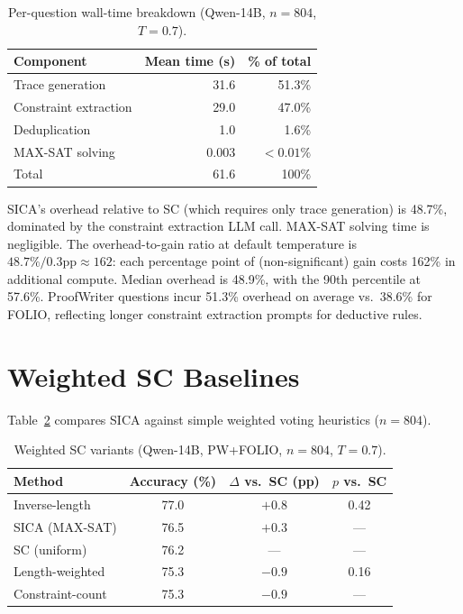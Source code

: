 \documentclass[11pt]{article}
\begin{document}
\begin{table}[h]
\centering
\caption{Per-question wall-time breakdown (Qwen-14B, $n{=}804$, $T{=}0.7$).}
\label{tab:overhead}
\small
\begin{tabular}{@{}lrr@{}}
\toprule
Component & Mean time (s) & \% of total \\
\midrule
Trace generation & 31.6 & 51.3\% \\
Constraint extraction & 29.0 & 47.0\% \\
Deduplication & 1.0 & 1.6\% \\
MAX-SAT solving & 0.003 & ${<}0.01\%$ \\
\midrule
Total & 61.6 & 100\% \\
\bottomrule
\end{tabular}
\end{table}

SICA's overhead relative to SC (which requires only trace generation) is 48.7\%, dominated by the constraint extraction LLM call.
MAX-SAT solving time is negligible.
The overhead-to-gain ratio at default temperature is $48.7\% / 0.3\text{pp} \approx 162$: each percentage point of (non-significant) gain costs 162\% in additional compute.
Median overhead is 48.9\%, with the 90th percentile at 57.6\%.
ProofWriter questions incur 51.3\% overhead on average vs.\ 38.6\% for FOLIO, reflecting longer constraint extraction prompts for deductive rules.

\section{Weighted SC Baselines}
\label{app:weightedsc}

Table~\ref{tab:weighted_sc} compares SICA against simple weighted voting heuristics ($n{=}804$).

\begin{table}[h]
\centering
\caption{Weighted SC variants (Qwen-14B, PW+FOLIO, $n{=}804$, $T{=}0.7$).}
\label{tab:weighted_sc}
\small
\begin{tabular}{@{}lccc@{}}
\toprule
Method & Accuracy (\%) & $\Delta$ vs.\ SC (pp) & $p$ vs.\ SC \\
\midrule
Inverse-length & 77.0 & $+0.8$ & 0.42 \\
SICA (MAX-SAT) & 76.5 & $+0.3$ & --- \\
SC (uniform) & 76.2 & --- & --- \\
Length-weighted & 75.3 & $-0.9$ & 0.16 \\
Constraint-count & 75.3 & $-0.9$ & --- \\
\bottomrule
\end{tabular}
\end{table}
\end{document}
